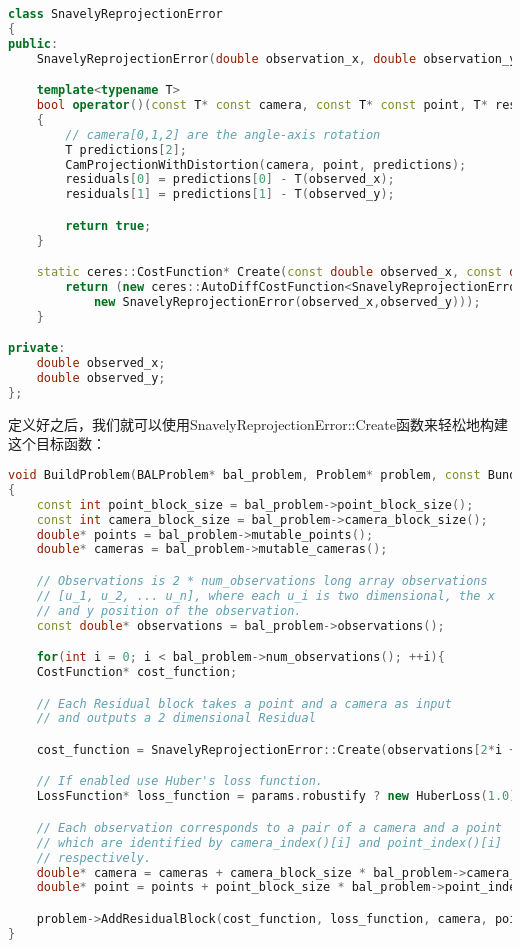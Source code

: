 \begin{lstlisting}[language=c++,caption=slambook/ch10/ceres_custombundle/SnavelyReprojectionError.h]
class SnavelyReprojectionError
{
public:
	SnavelyReprojectionError(double observation_x, double observation_y):observed_x(observation_x),observed_y(observation_y){}

	template<typename T>
	bool operator()(const T* const camera, const T* const point, T* residuals)const
	{                  
		// camera[0,1,2] are the angle-axis rotation
		T predictions[2];
		CamProjectionWithDistortion(camera, point, predictions);
		residuals[0] = predictions[0] - T(observed_x);
		residuals[1] = predictions[1] - T(observed_y);

		return true;
	}

	static ceres::CostFunction* Create(const double observed_x, const double observed_y){
		return (new ceres::AutoDiffCostFunction<SnavelyReprojectionError,2,9,3>(
			new SnavelyReprojectionError(observed_x,observed_y)));
	}

private:
	double observed_x;
	double observed_y;
};
\end{lstlisting}

定义好之后，我们就可以使用SnavelyReprojectionError::Create函数来轻松地构建这个目标函数：

\begin{lstlisting}[language=c++,caption=slambook/ch10/ceres_custombundle/ceresBundle.cpp（片段）]
void BuildProblem(BALProblem* bal_problem, Problem* problem, const BundleParams& params)
{
	const int point_block_size = bal_problem->point_block_size();
	const int camera_block_size = bal_problem->camera_block_size();
	double* points = bal_problem->mutable_points();
	double* cameras = bal_problem->mutable_cameras();

	// Observations is 2 * num_observations long array observations
	// [u_1, u_2, ... u_n], where each u_i is two dimensional, the x 
	// and y position of the observation. 
	const double* observations = bal_problem->observations();

	for(int i = 0; i < bal_problem->num_observations(); ++i){
	CostFunction* cost_function;

	// Each Residual block takes a point and a camera as input 
	// and outputs a 2 dimensional Residual

	cost_function = SnavelyReprojectionError::Create(observations[2*i + 0], observations[2*i + 1]);

	// If enabled use Huber's loss function. 
	LossFunction* loss_function = params.robustify ? new HuberLoss(1.0) : NULL;

	// Each observation corresponds to a pair of a camera and a point 
	// which are identified by camera_index()[i] and point_index()[i]
	// respectively.
	double* camera = cameras + camera_block_size * bal_problem->camera_index()[i];
	double* point = points + point_block_size * bal_problem->point_index()[i];

	problem->AddResidualBlock(cost_function, loss_function, camera, point);
}
\end{lstlisting}

